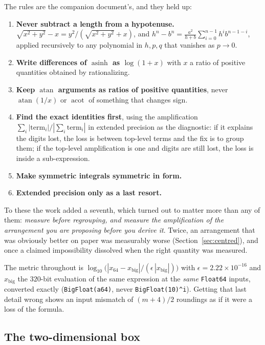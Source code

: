 \documentclass[11pt]{article}
\theoremstyle{remark}
\newcommand{\asinh}{\operatorname{asinh}}
\newcommand{\atan}{\operatorname{atan}}
\newcommand{\code}[1]{\texttt{#1}}
\begin{document}
The rules are the companion document's, and they held up:
\begin{enumerate}[nosep]
\item \textbf{Never subtract a length from a hypotenuse.}
$\sqrt{x^2+y^2} - x = y^2/(\sqrt{x^2+y^2}+x)$, and
$h^n - b^n = \frac{a^2}{h+b}\sum_{i=0}^{n-1}h^ib^{n-1-i}$, applied recursively to any
polynomial in $h, p, q$ that vanishes as $p\to 0$.
\item \textbf{Write differences of $\asinh$ as $\log(1+x)$} with $x$ a ratio of positive
quantities obtained by rationalizing.
\item \textbf{Keep $\atan$ arguments as ratios of positive quantities}, never
$\atan(1/x)$ or $\operatorname{acot}$ of something that changes sign.
\item \textbf{Find the exact identities first}, using the amplification
$\sum_i|\mathrm{term}_i| / |\sum_i \mathrm{term}_i|$ in extended precision as the
diagnostic: if it explains the digits lost, the loss is between top-level terms and the
fix is to group them; if the top-level amplification is one and digits are still lost, the
loss is inside a sub-expression.
\item \textbf{Make symmetric integrals symmetric in form.}
\item \textbf{Extended precision only as a last resort.}
\end{enumerate}
To these the work added a seventh, which turned out to matter more than any of them:
\emph{measure before regrouping, and measure the amplification of the arrangement you are
proposing before you derive it}. Twice, an arrangement that was obviously better on paper
was measurably worse (Section~\ref{sec:centred}), and once a claimed impossibility
dissolved when the right quantity was measured.

The metric throughout is
$\log_{10}\bigl(|x_{64} - x_{\mathrm{big}}| / (\epsilon\,|x_{\mathrm{big}}|)\bigr)$ with
$\epsilon = 2.22\times10^{-16}$ and $x_{\mathrm{big}}$ the $320$-bit evaluation of the same
expression at the \emph{same} \code{Float64} inputs, converted exactly
(\code{BigFloat(a64)}, never \code{BigFloat(10)\^{}i}). Getting that last detail wrong
shows an input mismatch of $(m+4)/2$ roundings as if it were a loss of the formula.

\subsection{The two-dimensional box}
\label{sec:cancel2}
\end{document}
